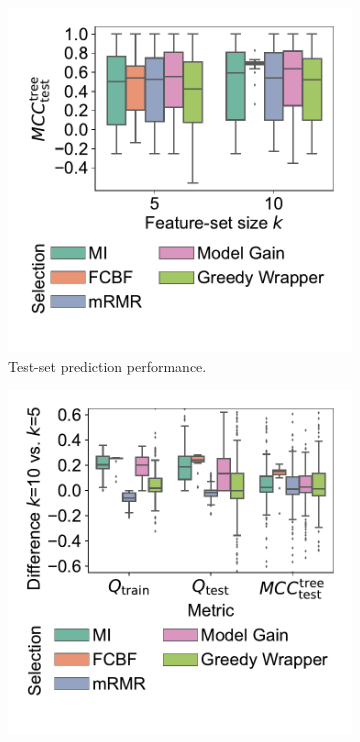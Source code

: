 \documentclass{article}
\theoremstyle{definition}
\begin{document}
\begin{figure}[htb]
	\centering
	\begin{subfigure}[t]{0.48\textwidth}
		\centering
		\includegraphics[width=\textwidth, trim=15 40 15 15, clip]{plots/impact-fs-method-k-decision-tree-test-mcc.pdf}
		\caption{Test-set prediction performance.}
		\label{fig:afs:impact-fs-method-k-decision-tree-test-mcc}
	\end{subfigure}
	\hfill
	\begin{subfigure}[t]{0.48\textwidth}
		\centering
		\includegraphics[width=\textwidth, trim=15 40 15 15, clip]{plots/impact-fs-method-k-metric-diff.pdf}

\end{subfigure}
\end{figure}
\end{document}
